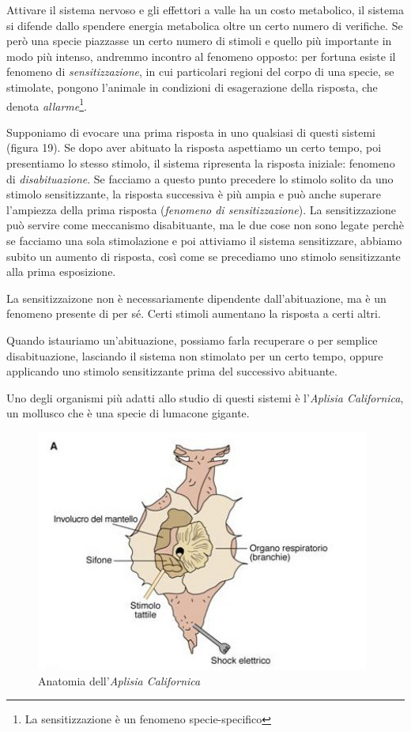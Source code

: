 \documentclass[a4paper,12pt]{article}
\begin{document}
Attivare il sistema nervoso e gli effettori a valle ha un costo metabolico, il sistema si difende dallo spendere energia metabolica oltre un certo numero di verifiche. Se però una specie piazzasse un certo numero di stimoli e quello più importante in modo più intenso, andremmo incontro al fenomeno opposto: per fortuna esiste il fenomeno di \emph{sensitizzazione}, in cui particolari regioni del corpo di una specie, se stimolate, pongono l'animale in condizioni di esagerazione della risposta, che denota \emph{allarme}\footnote{La sensitizzazione è un fenomeno specie-specifico}.

Supponiamo di evocare una prima risposta in uno qualsiasi di questi sistemi (figura 19). Se dopo aver abituato la risposta aspettiamo un certo tempo, poi presentiamo lo stesso stimolo, il sistema ripresenta la risposta iniziale: fenomeno di \emph{disabituazione}. Se facciamo a questo punto precedere lo stimolo solito da uno stimolo sensitizzante, la risposta successiva è più ampia e può anche superare l'ampiezza della prima risposta (\emph{fenomeno di sensitizzazione}). La sensitizzazione può servire come meccanismo disabituante, ma le due cose non sono legate perchè se facciamo una sola stimolazione e poi attiviamo il sistema sensitizzare, abbiamo subito un aumento di risposta, così come se precediamo uno stimolo sensitizzante alla prima esposizione.

La sensitizzaizone non è necessariamente dipendente dall'abituazione, ma è un fenomeno presente di per sé. Certi stimoli aumentano la risposta a certi altri.

Quando istauriamo un'abituazione, possiamo farla recuperare o per semplice disabituazione, lasciando il sistema non stimolato per un certo tempo, oppure applicando uno stimolo sensitizzante prima del successivo abituante.

Uno degli organismi più adatti allo studio di questi sistemi è l'\emph{Aplisia Californica}, un mollusco che è una specie di lumacone gigante. 

\begin{figure}[H]
\centering
\includegraphics[scale=0.4]{immagine/lumaca.jpg}
\caption{Anatomia dell'\emph{Aplisia Californica}}
\end{figure}
\end{document}
